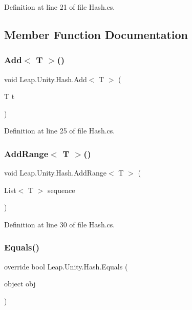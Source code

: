 Definition at line 21 of file Hash.\+cs.



\subsection{Member Function Documentation}
\mbox{\label{struct_leap_1_1_unity_1_1_hash_a0bfae32cff62bebe9947c6aabea3d04f}} 
\subsubsection{\texorpdfstring{Add$<$ T $>$()}{Add< T >()}}
{\footnotesize\ttfamily void Leap.\+Unity.\+Hash.\+Add$<$ T $>$ (\begin{DoxyParamCaption}\item[{T}]{t }\end{DoxyParamCaption})}



Definition at line 25 of file Hash.\+cs.

\mbox{\label{struct_leap_1_1_unity_1_1_hash_a3858e9f1fe271cbde1c5d223409187bb}} 
\subsubsection{\texorpdfstring{AddRange$<$ T $>$()}{AddRange< T >()}}
{\footnotesize\ttfamily void Leap.\+Unity.\+Hash.\+Add\+Range$<$ T $>$ (\begin{DoxyParamCaption}\item[{List$<$ T $>$}]{sequence }\end{DoxyParamCaption})}



Definition at line 30 of file Hash.\+cs.

\mbox{\label{struct_leap_1_1_unity_1_1_hash_ab0efc09e8430daada3c57955b9d8a6da}} 
\subsubsection{\texorpdfstring{Equals()}{Equals()}\hspace{0.1cm}{\footnotesize\ttfamily [1/2]}}
{\footnotesize\ttfamily override bool Leap.\+Unity.\+Hash.\+Equals (\begin{DoxyParamCaption}\item[{object}]{obj }\end{DoxyParamCaption})}



